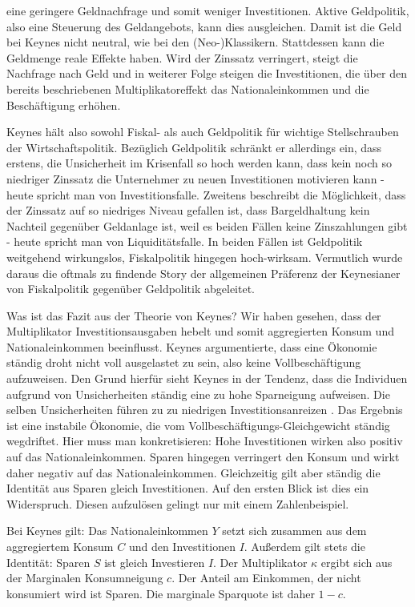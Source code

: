 eine geringere Geldnachfrage und somit weniger Investitionen. Aktive Geldpolitik, also eine Steuerung des Geldangebots, kann dies ausgleichen. Damit ist die Geld bei Keynes nicht neutral, wie bei den (Neo-)Klassikern. Stattdessen kann die Geldmenge reale Effekte haben. Wird der Zinssatz verringert, steigt die Nachfrage nach Geld und in weiterer Folge steigen die Investitionen, die über den bereits beschriebenen Multiplikatoreffekt das Nationaleinkommen und die Beschäftigung erhöhen.

Keynes hält also sowohl Fiskal- als auch Geldpolitik für wichtige Stellschrauben der Wirtschaftspolitik. Bezüglich Geldpolitik schränkt er allerdings ein, dass erstens, die Unsicherheit im Krisenfall so hoch werden kann, dass kein noch so niedriger Zinssatz die Unternehmer zu neuen Investitionen motivieren kann \parencite[S. 208]{Keynes1936} - heute spricht man von Investitionsfalle. Zweitens beschreibt \textcite[S. 207]{Keynes} die Möglichkeit, dass der Zinssatz auf so niedriges Niveau gefallen ist, dass Bargeldhaltung kein Nachteil gegenüber Geldanlage ist, weil es beiden Fällen keine Zinszahlungen gibt - heute spricht man von Liquiditätsfalle. In beiden Fällen ist Geldpolitik weitgehend wirkungslos, Fiskalpolitik hingegen hoch-wirksam. Vermutlich wurde daraus die oftmals zu findende Story der allgemeinen Präferenz der Keynesianer von Fiskalpolitik gegenüber Geldpolitik abgeleitet.

Was ist das Fazit aus der Theorie von Keynes? Wir haben gesehen, dass der Multiplikator Investitionsausgaben hebelt und somit aggregierten Konsum und Nationaleinkommen beeinflusst. Keynes argumentierte, dass eine Ökonomie ständig droht nicht voll ausgelastet zu sein, also keine Vollbeschäftigung aufzuweisen. Den Grund hierfür sieht Keynes in der Tendenz, dass die Individuen aufgrund von Unsicherheiten ständig eine zu hohe Sparneigung aufweisen. Die selben Unsicherheiten führen zu zu niedrigen Investitionsanreizen \parencite[S. 63]{Snowdon2005}. Das Ergebnis ist eine instabile Ökonomie, die vom Vollbeschäftigungs-Gleichgewicht ständig wegdriftet. Hier muss man konkretisieren: Hohe Investitionen wirken also positiv auf das Nationaleinkommen. Sparen hingegen verringert den Konsum und wirkt daher negativ auf das Nationaleinkommen. Gleichzeitig gilt aber ständig die Identität aus Sparen gleich Investitionen. Auf den ersten Blick ist dies ein Widerspruch. Diesen aufzulösen gelingt nur mit einem Zahlenbeispiel.

Bei Keynes gilt: Das Nationaleinkommen $Y$ setzt sich zusammen aus dem aggregiertem Konsum $C$ und den Investitionen $I$. Außerdem gilt stets die Identität: Sparen $S$ ist gleich Investieren $I$. Der Multiplikator $\kappa$ ergibt sich aus der Marginalen Konsumneigung $c$. Der Anteil am Einkommen, der nicht konsumiert wird ist Sparen. Die marginale Sparquote ist daher $1-c$.

